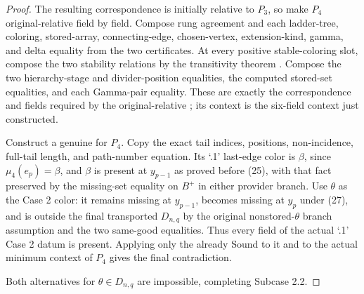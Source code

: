 \begin{proof}
The resulting correspondence is initially relative to \(P_3\), so make
\(P_4\) original-relative field by field.  Compose rung agreement and
each ladder-tree, coloring, stored-array, connecting-edge, chosen-vertex,
extension-kind, gamma, and delta equality from the two
 certificates.  At every
positive stable-coloring slot, compose the two stability relations by
the transitivity theorem .  Compose the two hierarchy-stage
and divider-position equalities, the computed stored-set equalities, and
each Gamma-pair equality.  These are exactly the correspondence and
 fields required by the original-relative
; its context is the six-field
context just constructed.

Construct a genuine  for
\(P_4\).  Copy the exact tail indices, positions, non-incidence,
full-tail length, and path-number equation.  Its `.1' last-edge color is
\(\beta\), since \(\mu_4(e_p)=\beta\), and \(\beta\) is present at
\(y_{p-1}\) as proved before (25), with that fact preserved by the
missing-set equality on \(B^+\) in either provider branch.  Use
\(\theta\) as the Case 2 color:
it remains missing at \(y_{p-1}\), becomes missing at \(y_p\) under
(27), and is outside the final transported \(D_{n,q}\) by the original
nonstored-\(\theta\) branch assumption and the two same-good
equalities.  Thus every
field of the actual `.1' Case 2 datum is present.  Applying only the
already Sound  to it and to
the actual minimum context of \(P_4\) gives the final contradiction.

Both alternatives for \(\theta\in D_{n,q}\) are impossible, completing
Subcase 2.2.
\end{proof}
